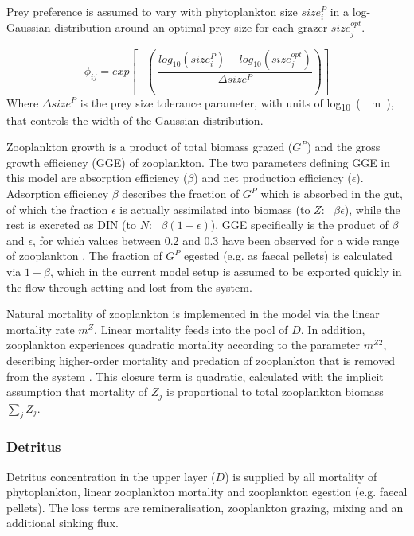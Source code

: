 \documentclass[journal abbreviations, manuscript]{copernicus}
\begin{document}
Prey preference is assumed to vary with phytoplankton size $size_i^{P}$ in a log-Gaussian distribution around an optimal prey size for each grazer $size_j^{opt}$.

\begin{equation}
    \phi_{ij} = exp \left[ -\left( \ \frac{ log_{10}(size_i^{P}) - log_{10}(size_j^{opt}) }{ \Delta size^{P} } \right) \right]
\end{equation}
Where $\Delta size^{P}$ is the prey size tolerance parameter, with units of \unit{log_{10}(\mu m)}, that controls the width of the Gaussian distribution.

Zooplankton growth is a product of total biomass grazed ($G^P$) and the gross growth efficiency (GGE) of zooplankton. The two parameters defining GGE in this model are absorption efficiency ($\beta$) and net production efficiency ($\epsilon$). Adsorption efficiency $\beta$ describes the fraction of $G^P$ which is absorbed in the gut, of which the fraction $\epsilon$ is actually assimilated into biomass (to $Z$: \ $\beta \epsilon$), while the rest is excreted as DIN (to $N$: \ $\beta (1-\epsilon)$). GGE specifically is the product of $\beta$ and $\epsilon$, for which values between 0.2 and 0.3 have been observed for a wide range of zooplankton  \citep{Straile1997GrossGroup}. The fraction of $G^P$ egested (e.g. as faecal pellets) is calculated via $1-\beta$, which in the current model setup is assumed to be exported quickly in the flow-through setting and lost from the system. 

Natural mortality of zooplankton is implemented in the model via the linear mortality rate $m^Z$. Linear mortality feeds into the pool of $D$. In addition, zooplankton experiences quadratic mortality according to the parameter $m^{Z2}$, describing higher-order mortality and predation of zooplankton that is removed from the system \citep{Edwards2000TheModels}. This closure term is quadratic, calculated with the implicit assumption that mortality of $Z_j$ is proportional to total zooplankton biomass $\sum_{j} Z_j$.

\subsubsection{Detritus}
Detritus concentration in the upper layer ($D$) is supplied by all mortality of phytoplankton, linear zooplankton mortality and zooplankton egestion (e.g. faecal pellets). The loss terms are remineralisation, zooplankton grazing, mixing and an additional sinking flux. 
\end{document}
